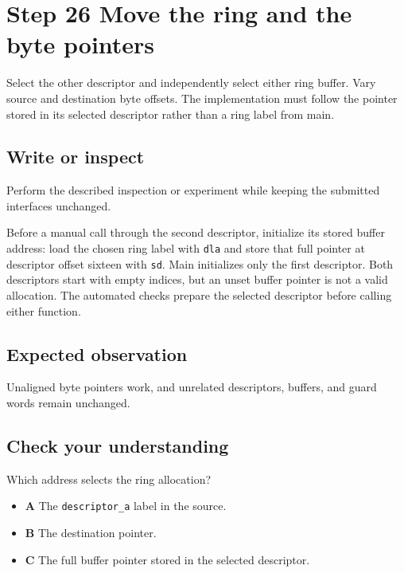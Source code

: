\section{Step 26 Move the ring and the byte pointers}\label{ring-s26}

Select the other descriptor and independently select either ring buffer. Vary source and destination byte offsets. The implementation must follow the pointer stored in its selected descriptor rather than a ring label from main.

\subsection{Write or inspect}
Perform the described inspection or experiment while keeping the submitted interfaces unchanged.

Before a manual call through the second descriptor, initialize its stored buffer
address: load the chosen ring label with \texttt{dla} and store that full pointer
at descriptor offset sixteen with \texttt{sd}. Main initializes only the first
descriptor. Both descriptors start with empty indices, but an unset buffer pointer
is not a valid allocation. The automated checks prepare the selected descriptor
before calling either function.

\subsection{Expected observation}
Unaligned byte pointers work, and unrelated descriptors, buffers, and guard words remain unchanged.

\subsection{Check your understanding}
Which address selects the ring allocation?

\begin{itemize}
  \item \textbf{A} The \texttt{descriptor\_a} label in the source.
  \item \textbf{B} The destination pointer.
  \item \textbf{C} The full buffer pointer stored in the selected descriptor.
\end{itemize}
